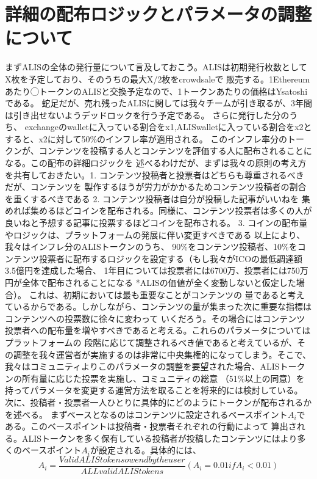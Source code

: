 \documentclass{jsarticle}
\begin{document}
\section{詳細の配布ロジックとパラメータの調整について}
まずALISの全体の発行量について言及しておこう。ALISは初期発行枚数としてX枚を予定しており、そのうちの最大X/2枚をcrowdsaleで
販売する。1Ethereumあたり◯トークンのALISと交換予定なので、1トークンあたりの価格はYsatoshiである。
蛇足だが、売れ残ったALISに関しては我々チームが引き取るが、3年間は引き出せないようデッドロックを行う予定である。
さらに発行した分のうち、
exchangeのwalletに入っている割合をx1,ALISwalletに入っている割合をx2とすると、x2に対して50\%のインフレ率が適用される。
このインフレ率分のトークンが、コンテンツを投稿する人とコンテンツを評価する人に配布されることになる。この配布の詳細ロジックを
述べるわけだが、まずは我々の原則の考え方を共有しておきたい。1. コンテンツ投稿者と投票者はどちらも尊重されるべきだが、コンテンツを
製作するほうが労力がかかるためコンテンツ投稿者の割合を重くするべきである 2. コンテンツ投稿者は自分が投稿した記事がいいねを
集めれば集めるほどコインを配布される。同様に、コンテンツ投票者は多くの人が良いねと予想する記事に投票するほどコインを配布される。 
3. コインの配布量やロジックは、プラットフォームの発展に伴い変更すべきである 以上により、我々はインフレ分のALISトークンのうち、
90\%をコンテンツ投稿者、10\%をコンテンツ投票者に配布するロジックを設定する（もし我々がICOの最低調達額3.5億円を達成した場合、
1年目については投票者には6700万、投票者には750万円が全体で配布されることになる *ALISの価値が全く変動しないと仮定した場合）。
これは、初期においては最も重要なことがコンテンツの
量であると考えているからである。しかしながら、コンテンツの量が集まった次に重要な指標はコンテンツへの投票数に徐々に変わって
いくだろう。その場合にはコンテンツ投票者への配布量を増やすべきであると考える。これらのパラメータについてはプラットフォームの
段階に応じて調整されるべき値であると考えているが、その調整を我々運営者が実施するのは非常に中央集権的になってしまう。そこで、
我々はコミュニティよりこのパラメータの調整を要望された場合、ALISトークンの所有量に応じた投票を実施し、コミュニティの総意
（51\%以上の同意）を持ってパラメータを変更する運営方法を取ることを将来的には検討している。
次に、投稿者・投票者一人ひとりに具体的にどのようにトークンが配布されるかを述べる。
まずベースとなるのはコンテンツに設定されるベースポイント$A_{i}$である。このベースポイントは投稿者・投票者それぞれの行動によって
算出される。ALISトークンを多く保有している投稿者が投稿したコンテンツにはより多くのベースポイント$A_{i}$が設定される。具体的には、
\begin{equation}
A_{i} = \frac{Valid ALIS tokens owend by the user}{ALL valid ALIS tokens} (A_{i} = 0.01 if A_{i} < 0.01)
\end{equation} 
\end{document}
